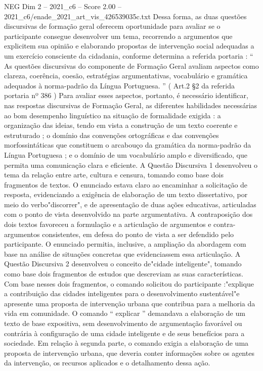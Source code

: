 \begin{textsample}{NEG Dim 2 – 2021\_c6 – Score 2.00 – 2021\_c6/enade\_2021\_art\_vis\_426539035c.txt}
Dessa forma, as duas questões discursivas de formação geral oferecem oportunidade para avaliar se o participante consegue desenvolver um tema, recorrendo a argumentos que explicitem sua opinião e elaborando propostas de intervenção social adequadas a um exercício consciente da cidadania, conforme determina a referida portaria : “ As questões discursivas do componente de Formação Geral avaliam aspectos como clareza, coerência, coesão, estratégias argumentativas, vocabulário e gramática adequados à norma-padrão da Língua Portuguesa. ” ( Art.2 §2 da referida portaria nº 386 ) Para avaliar esses aspectos, portanto, é necessário identificar, nas respostas discursivas de Formação Geral, as diferentes habilidades necessárias ao bom desempenho linguístico na situação de formalidade exigida : a organização das ideias, tendo em vista a construção de um texto coerente e estruturado ; o domínio das convenções ortográficas e das convenções morfossintáticas que constituem o arcabouço da gramática da norma-padrão da Língua Portuguesa ; e o domínio de um vocabulário amplo e diversificado, que permita uma comunicação clara e eficiente.
A Questão Discursiva 1 desenvolveu o tema da relação entre arte, cultura e censura, tomando como base dois fragmentos de textos.
O enunciado estava claro ao encaminhar a solicitação de resposta, evidenciando a exigência de elaboração de um texto dissertativo, por meio do verbo"discorrer", e de apresentação de duas ações educativas, articuladas com o ponto de vista desenvolvido na parte argumentativa.
A contraposição dos dois textos favoreceu a formulação e a articulação de argumentos e contra-argumentos consistentes, em defesa do ponto de vista a ser defendido pelo participante.
O enunciado permitia, inclusive, a ampliação da abordagem com base na análise de situações concretas que evidenciassem essa articulação.
A Questão Discursiva 2 desenvolveu o conceito de"cidade inteligente", tomando como base dois fragmentos de estudos que descreviam as suas características.
Com base nesses dois fragmentos, o comando solicitou do participante :"explique a contribuição das cidades inteligentes para o desenvolvimento sustentável"e apresente uma proposta de intervenção urbana que contribua para a melhoria da vida em comunidade.
O comando “ explicar ” demandava a elaboração de um texto de base expositiva, sem desenvolvimento de argumentação favorável ou contrária à configuração de uma cidade inteligente e de seus benefícios para a sociedade.
Em relação à segunda parte, o comando exigia a elaboração de uma proposta de intervenção urbana, que deveria conter informações sobre os agentes da intervenção, os recursos aplicados e o detalhamento dessa ação.

\end{textsample}
